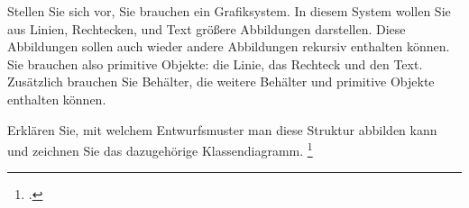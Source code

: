 \documentclass{bschlangaul-aufgabe}
\begin{document}

Stellen Sie sich vor, Sie brauchen ein Grafiksystem. In diesem System
wollen Sie aus Linien, Rechtecken, und Text größere Abbildungen
darstellen. Diese Abbildungen sollen auch wieder andere Abbildungen
rekursiv enthalten können. Sie brauchen also primitive Objekte: die
Linie, das Rechteck und den Text. Zusätzlich brauchen Sie Behälter, die
weitere Behälter und primitive Objekte enthalten können.

Erklären Sie, mit welchem Entwurfsmuster man diese Struktur abbilden
kann und zeichnen Sie das dazugehörige Klassendiagramm.
\footcite{sosy:ab:6}
\end{document}
